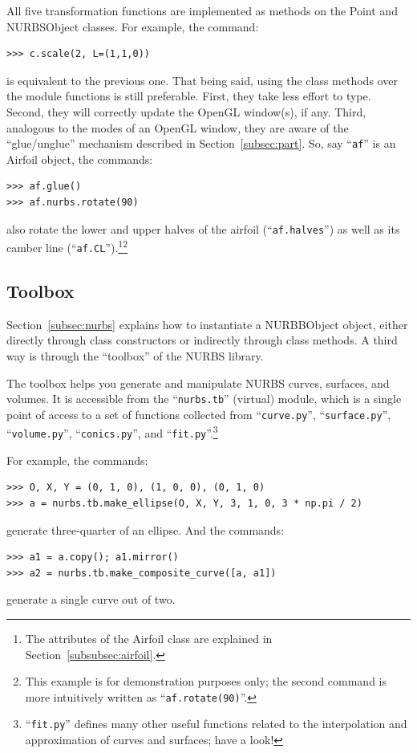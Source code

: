 \documentclass[]{article}
\begin{document}
All five transformation functions are implemented as methods on the 
Point and NURBSObject classes.  For example, the command:
\begin{verbatim}
>>> c.scale(2, L=(1,1,0))
\end{verbatim}
is equivalent to the previous one.  That being said, using the class 
methods over the module functions is still preferable.  First, they take 
less effort to type.  Second, they will correctly update the OpenGL 
window(s), if any.  Third, analogous to the modes of an OpenGL window, 
they are aware of the ``glue/unglue'' mechanism described in 
Section~\ref{subsec:part}.  So, say ``\texttt{af}'' is an Airfoil 
object, the commands:
\begin{verbatim}
>>> af.glue()
>>> af.nurbs.rotate(90)
\end{verbatim}
also rotate the lower and upper halves of the airfoil 
(``\texttt{af.halves}'') as well as its camber line 
(``\texttt{af.CL}'').\footnote{The attributes of the Airfoil class are 
explained in Section~\ref{subsubsec:airfoil}.}\footnote{This example is 
for demonstration purposes only; the second command is more intuitively 
written as ``\texttt{af.rotate(90)}''.}

\subsection{Toolbox}
\label{subsec:toolbox}

Section~\ref{subsec:nurbs} explains how to instantiate a NURBBObject 
object, either directly through class constructors or indirectly through 
class methods.  A third way is through the ``toolbox'' of the NURBS 
library.

The toolbox helps you generate and manipulate NURBS curves, surfaces, 
and volumes.  It is accessible from the ``\texttt{nurbs.tb}'' (virtual) 
module, which is a single point of access to a set of functions 
collected from ``\texttt{curve.py}'', ``\texttt{surface.py}'', 
``\texttt{volume.py}'', ``\texttt{conics.py}'', and 
``\texttt{fit.py}''.\footnote{``\texttt{fit.py}'' defines many other 
useful functions related to the interpolation and approximation of 
curves and surfaces; have a look!}

For example, the commands:
\begin{verbatim}
>>> O, X, Y = (0, 1, 0), (1, 0, 0), (0, 1, 0)
>>> a = nurbs.tb.make_ellipse(O, X, Y, 3, 1, 0, 3 * np.pi / 2)
\end{verbatim}
generate three-quarter of an ellipse.  And the commands:
\begin{verbatim}
>>> a1 = a.copy(); a1.mirror()
>>> a2 = nurbs.tb.make_composite_curve([a, a1])
\end{verbatim}
generate a single curve out of two.
\end{document}
